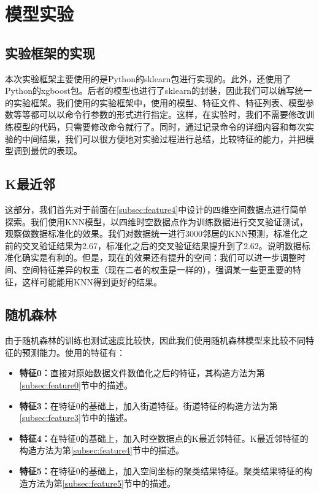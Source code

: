 \section{模型实验}
\label{sec:model}

\subsection{实验框架的实现}

本次实验框架主要使用的是Python的sklearn包进行实现的。此外，还使用了Python的xgboost包。后者的模型也进行了sklearn的封装，因此我们可以编写统一的实验框架。我们使用的实验框架中，使用的模型、特征文件、特征列表、模型参数等等都可以以命令行参数的形式进行指定。这样，在实验时，我们不需要修改训练模型的代码，只需要修改命令就行了。同时，通过记录命令的详细内容和每次实验的中间结果，我们可以很方便地对实验过程进行总结，比较特征的能力，并把模型调到最优的表现。

\subsection{K最近邻}

这部分，我们首先对于前面在\ref{subsec:feature4}中设计的四维空间数据点进行简单探索。我们使用KNN模型，以四维时空数据点作为训练数据进行交叉验证测试，观察做数据标准化的效果。我们对数据统一进行3000邻居的KNN预测，标准化之前的交叉验证结果为2.67，标准化之后的交叉验证结果提升到了2.62。说明数据标准化确实是有利的。但是，现在的效果还有提升的空间：我们可以进一步调整时间、空间特征差异的权重（现在二者的权重是一样的），强调某一些更重要的特征，这样可能能用KNN得到更好的结果。

\subsection{随机森林}

由于随机森林的训练也测试速度比较快，因此我们使用随机森林模型来比较不同特征的预测能力。使用的特征有：

\begin{itemize}
    \item \textbf{特征0：}直接对原始数据文件数值化之后的特征，其构造方法为第\ref{subsec:feature0}节中的描述。
    \item \textbf{特征3：}在特征0的基础上，加入街道特征。街道特征的构造方法为第\ref{subsec:feature3}节中的描述。
    \item \textbf{特征4：}在特征0的基础上，加入时空数据点的K最近邻特征。K最近邻特征的构造方法为第\ref{subsec:feature4}节中的描述。
    \item \textbf{特征5：}在特征0的基础上，加入空间坐标的聚类结果特征。聚类结果特征的构造方法为第\ref{subsec:feature5}节中的描述。
\end{itemize}

